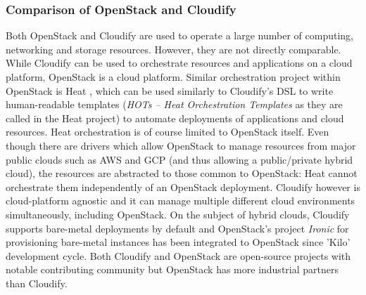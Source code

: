 \subsubsection{Comparison of OpenStack and Cloudify}

Both OpenStack and Cloudify are used to operate a large number of computing, networking and storage resources. However, they are not directly comparable. While Cloudify can be used to orchestrate resources and applications on a cloud platform, OpenStack is a cloud platform. Similar orchestration project within OpenStack is Heat \cite{heat}, which can be used similarly to Cloudify's DSL to write human-readable templates (\textit{HOTs -- Heat Orchestration Templates} as they are called in the Heat project) to automate deployments of applications and cloud resources. Heat orchestration is of course limited to OpenStack itself. Even though there are drivers which allow OpenStack to manage resources from major public clouds such as AWS and GCP (and thus allowing a public/private hybrid cloud), the resources are abstracted to those common to OpenStack: Heat cannot orchestrate them independently of an OpenStack deployment. Cloudify however is cloud-platform agnostic and it can manage multiple different cloud environments simultaneously, including OpenStack. On the subject of hybrid clouds, Cloudify supports bare-metal deployments by default and OpenStack's project \textit{Ironic} for provisioning bare-metal instances has  been integrated to OpenStack since 'Kilo' development cycle.
Both Cloudify and OpenStack are open-source projects with notable contributing community but OpenStack has more industrial partners than Cloudify. 


